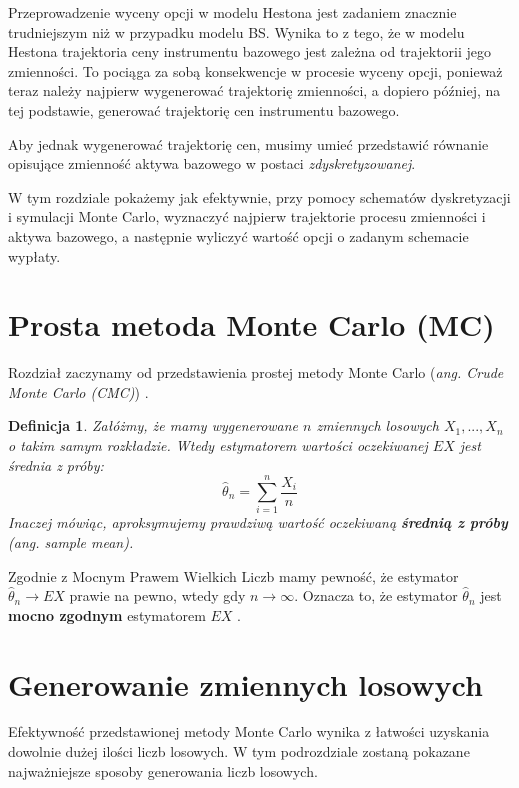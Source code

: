 \documentclass{pracamgr}
\newtheorem{defi}{Definicja}[section]
\begin{document}
Przeprowadzenie wyceny opcji w modelu Hestona jest zadaniem znacznie trudniejszym
niż w przypadku modelu BS. Wynika to z tego, że w modelu Hestona trajektoria 
ceny instrumentu bazowego jest zależna od trajektorii jego zmienności. To pociąga za sobą
konsekwencje w procesie wyceny opcji, ponieważ teraz należy najpierw wygenerować trajektorię
zmienności, a dopiero później, na tej podstawie, generować trajektorię cen instrumentu bazowego.

Aby jednak wygenerować trajektorię cen, musimy umieć przedstawić równanie opisujące
zmienność aktywa bazowego w postaci \textit{zdyskretyzowanej}.

W tym rozdziale pokażemy jak efektywnie, przy pomocy schematów dyskretyzacji i symulacji Monte Carlo, 
wyznaczyć najpierw trajektorie procesu zmienności i aktywa bazowego, a następnie wyliczyć wartość
opcji o zadanym schemacie wypłaty.

\section{Prosta metoda Monte Carlo (MC)}
\label{sec:mc}

Rozdział zaczynamy od przedstawienia prostej metody 
Monte Carlo (\textit{ang. Crude Monte Carlo (CMC)}) \cite{Niemiro}.

\begin{defi}
Załóżmy, że mamy wygenerowane $n$ zmiennych losowych $X_1, ..., X_n$ o takim samym rozkładzie. 
Wtedy estymatorem wartości oczekiwanej $EX$ jest średnia z próby:
\begin{equation}
  \hat{\theta}_n = \sum_{i=1}^n \frac{X_i}{n}
\end{equation}
Inaczej mówiąc, aproksymujemy prawdziwą wartość oczekiwaną 
\textbf{średnią z próby} (\textit{ang. sample mean}).
\end{defi}


Zgodnie z Mocnym Prawem Wielkich Liczb mamy pewność, że estymator 
$\hat{\theta}_n \rightarrow EX$ prawie na pewno, wtedy gdy $n \rightarrow \infty$. 
Oznacza to, że estymator $\hat{\theta}_n $ jest \textbf{mocno zgodnym} 
estymatorem $EX$ \cite{Glasserman}.



\section{Generowanie zmiennych losowych}
\label{sec:genRV}

Efektywność przedstawionej metody Monte Carlo wynika z łatwości uzyskania dowolnie dużej
ilości liczb losowych. 
W tym podrozdziale zostaną pokazane najważniejsze sposoby generowania liczb losowych.
\end{document}
